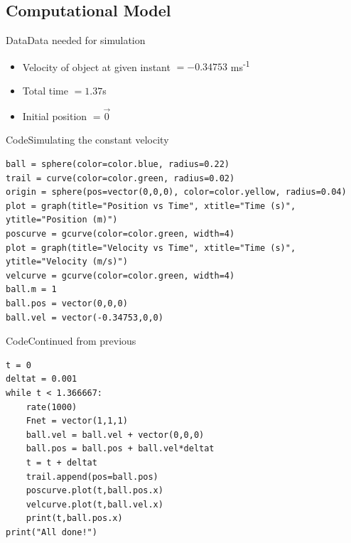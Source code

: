 \documentclass{beamer}
\begin{document}
\subsection{Computational Model}

\begin{frame}{Data}{Data needed for simulation}
\begin{itemize}
\item Velocity of object at given instant \( = -0.34753\)
 ms\textsuperscript{-1}
\item Total time \( = 1.37\)s
\item Initial position \( = \vec{0} \)
\end{itemize}
\end{frame}

\begin{frame}[fragile]{Code}{Simulating the constant velocity}
\begin{verbatim}
ball = sphere(color=color.blue, radius=0.22) 
trail = curve(color=color.green, radius=0.02)
origin = sphere(pos=vector(0,0,0), color=color.yellow, radius=0.04)
plot = graph(title="Position vs Time", xtitle="Time (s)", ytitle="Position (m)")
poscurve = gcurve(color=color.green, width=4)
plot = graph(title="Velocity vs Time", xtitle="Time (s)", ytitle="Velocity (m/s)")
velcurve = gcurve(color=color.green, width=4)
ball.m = 1
ball.pos = vector(0,0,0)
ball.vel = vector(-0.34753,0,0)
\end{verbatim}
\end{frame}

\begin{frame}[fragile]{Code}{Continued from previous}
\begin{verbatim}
t = 0           
deltat = 0.001   
while t < 1.366667:
    rate(1000)
    Fnet = vector(1,1,1)
    ball.vel = ball.vel + vector(0,0,0)
    ball.pos = ball.pos + ball.vel*deltat
    t = t + deltat
    trail.append(pos=ball.pos)
    poscurve.plot(t,ball.pos.x)
    velcurve.plot(t,ball.vel.x)
    print(t,ball.pos.x)
print("All done!")
\end{verbatim}
\end{frame}
\end{document}
